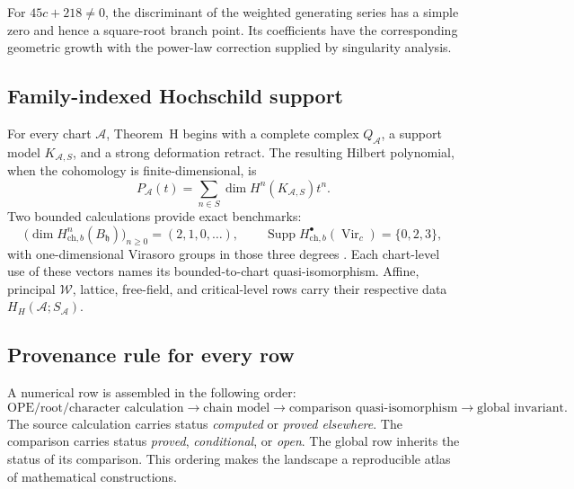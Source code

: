 \documentclass[11pt]{article}
\theoremstyle{plain}
\theoremstyle{definition}
\theoremstyle{remark}
\newcommand{\cA}{\mathcal{A}}
\newcommand{\cW}{\mathcal{W}}
\begin{document}
For \(45c+218\ne0\), the discriminant of the weighted generating
series has a simple zero and hence a square-root branch point.  Its
coefficients have the corresponding geometric growth with the
power-law correction supplied by singularity analysis.

\subsection{Family-indexed Hochschild support}

For every chart \(\cA\), Theorem~H begins with a complete complex
\(Q_\cA\), a support model \(K_{\cA,S}\), and a strong deformation
retract.  The resulting Hilbert polynomial, when the cohomology is
finite-dimensional, is
\[
 P_\cA(t)=\sum_{n\in S}\dim H^n(K_{\cA,S})t^n.
\]
Two bounded calculations provide exact benchmarks:
\[
 \bigl(\dim H^n_{\mathrm{ch},b}(B_{\mathfrak h})\bigr)_{n\ge0}
 =(2,1,0,\ldots),
 \qquad
 \operatorname{Supp}
 H^\bullet_{\mathrm{ch},b}(\operatorname{Vir}_c)=\{0,2,3\},
\]
with one-dimensional Virasoro groups in those three degrees
\cite[Theorems~7.4 and~7.2]{BDSK21}.  Each chart-level use of these
vectors names its bounded-to-chart quasi-isomorphism.  Affine,
principal \(\cW\), lattice, free-field, and critical-level rows carry
their respective data \(H_H(\cA;S_\cA)\).

\subsection{Provenance rule for every row}

A numerical row is assembled in the following order:
\[
 \text{OPE/root/character calculation}
 \longrightarrow
 \text{chain model}
 \longrightarrow
 \text{comparison quasi-isomorphism}
 \longrightarrow
 \text{global invariant}.
\]
The source calculation carries status \emph{computed} or
\emph{proved elsewhere}.  The comparison carries status
\emph{proved}, \emph{conditional}, or \emph{open}.  The global row
inherits the status of its comparison.  This ordering makes the
landscape a reproducible atlas of mathematical constructions.
\end{document}
